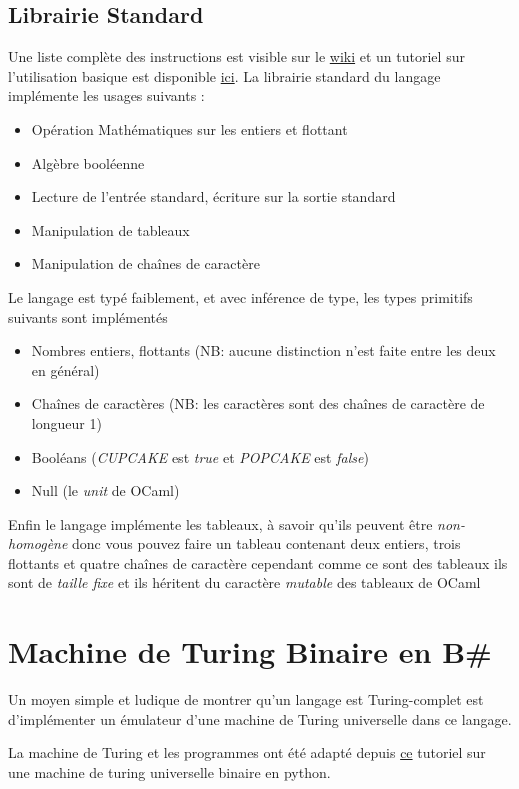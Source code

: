 \documentclass[11pt,colorlinks=true,a4paper]{article}
\newcommand{\bs}{B\# }
\begin{document}
    \subsection{Librairie Standard}
    Une liste complète des instructions est visible sur le \href{https://github.com/coco33920/ocaml-baguettesharp-interpreter/wiki}{wiki}
    et un tutoriel sur l'utilisation basique est disponible \href{https://www.baguettesharp.fr/basic.html}{ici}. La librairie 
    standard du langage implémente les usages suivants :
    \begin{itemize}
        \item Opération Mathématiques sur les entiers et flottant 
        \item Algèbre booléenne
        \item Lecture de l'entrée standard, écriture sur la sortie standard
        \item Manipulation de tableaux 
        \item Manipulation de chaînes de caractère
    \end{itemize}
    \bigskip


    Le langage est typé faiblement, et avec inférence de type, les types primitifs suivants sont implémentés
    \begin{itemize}
        \item Nombres entiers, flottants (NB: aucune distinction n'est faite entre les deux en général)
        \item Chaînes de caractères (NB: les caractères sont des chaînes de caractère de longueur 1)
        \item Booléans (\textit{CUPCAKE} est \textit{true} et \textit{POPCAKE} est \textit{false})
        \item Null (le \textit{unit} de OCaml)
    \end{itemize}
    \bigskip 

    Enfin le langage implémente les tableaux, à savoir qu'ils peuvent être \textit{non-homogène}
    donc vous pouvez faire un tableau contenant deux entiers, trois flottants et quatre chaînes de caractère
    cependant comme ce sont des tableaux ils sont de \textit{taille fixe} et ils héritent du caractère \textit{mutable}
    des tableaux de OCaml

    \section{Machine de Turing Binaire en \bs}
    Un moyen simple et ludique de montrer qu'un langage est Turing-complet est d'implémenter un émulateur d'une machine de Turing 
    universelle dans ce langage.\par 
    \bigskip 
    La machine de Turing et les programmes ont été adapté depuis \href{https://sandipanweb.wordpress.com/2020/08/08/simulating-a-turing-machine-with-python-and-executing-programs/}{ce} tutoriel sur une machine de turing universelle binaire 
    en python.
\end{document}
